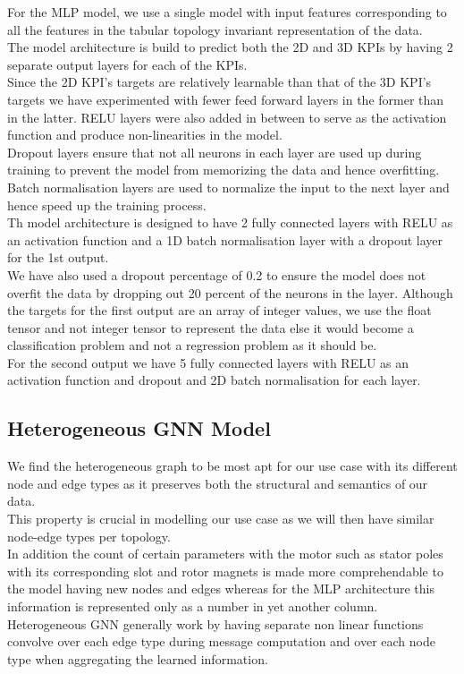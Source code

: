 \documentclass{report} %
\begin{document}
For the \ac{MLP} model, we use a single model with input features corresponding to all the features in the tabular topology invariant representation of the data.\\
The model architecture is build to predict both the \ac{2D} and \ac{3D} \ac{KPI}s by having 2 separate output layers for each of the \ac{KPI}s. \\
Since the \ac{2D} \ac{KPI}'s targets are relatively learnable than that of the \ac{3D} \ac{KPI}'s targets we have experimented with fewer feed forward layers in the former than in the latter.
RELU layers were also added in between to serve as the activation function and produce non-linearities in the model. \\
Dropout layers ensure that not all neurons in each layer are used up during training to prevent the model from memorizing the data and hence overfitting.
Batch normalisation layers are used to normalize the input to the next layer and hence speed up the training process.\\

Th model architecture is designed to have 2 fully connected layers with RELU as an activation function and a 1D batch normalisation layer with a dropout layer for the 1st output.\\
We have also used a dropout percentage of 0.2 to ensure the model does not overfit the data by dropping out 20 percent of the neurons in the layer.
Although the targets for the first output are an array of integer values, we use the float tensor and not integer tensor to represent the data else it would become a classification problem and not a regression problem as it should be. \\
For the second output we have 5 fully connected layers with RELU as an activation function and dropout and \ac{2D} batch normalisation for each layer.\\


\subsection*{Heterogeneous \ac{GNN} Model}

We find the heterogeneous graph to be most apt for our use case with its different node and edge types as it preserves both the structural and semantics of our data. \\
This property is crucial in modelling our use case as we will then have similar node-edge types per topology. \\
In addition the count of certain parameters with the motor such as stator poles with its corresponding slot and rotor magnets is made more comprehendable to the model having new nodes and edges whereas for the \ac{MLP} architecture this information is represented only as a number in yet another column. \\
Heterogeneous \ac{GNN} generally work by having separate non linear functions convolve over each edge type during message computation and over each node type when aggregating the learned information. \\
 
\end{document}
